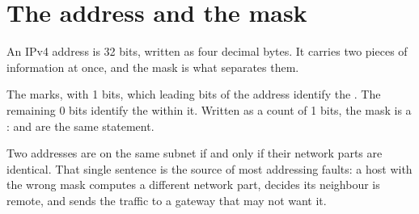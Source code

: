 \section{The address and the mask}

An IPv4 address is 32 bits, written as four decimal bytes. It carries two pieces
of information at once, and the mask is what separates them.

\begin{definitionbox}
The  marks, with 1 bits, which leading bits of the address
identify the . The remaining 0 bits identify the  within
it. Written as a count of 1 bits, the mask is a :
 and  are the same statement.

Two addresses are on the same subnet if and only if their network parts are
identical. That single sentence is the source of most addressing faults: a host
with the wrong mask computes a different network part, decides its neighbour is
remote, and sends the traffic to a gateway that may not want it.
\end{definitionbox}

